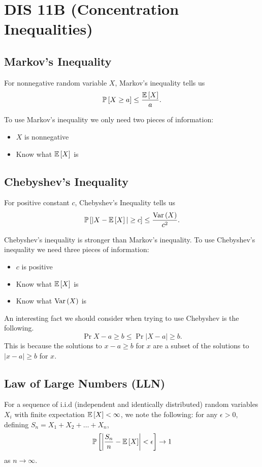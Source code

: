 \section{DIS 11B (Concentration Inequalities)}

\subsection{Markov's Inequality}
For nonnegative random variable $X$, Markov's inequality tells us \[ \mathbb{P}\left[ X \ge a \right] \le \frac{\mathbb{E}\left[ X \right]}{a}. \]

To use Markov's inequality we only need two pieces of information:
\begin{itemize}
    \item $X$ is nonnegative 
    \item Know what $\mathbb{E}\left[ X \right]$ is
\end{itemize}

\subsection{Chebyshev's Inequality}
For positive constant $c$, Chebyshev's Inequality tells us \[ \mathbb{P}\left[ |X-\mathbb{E}\left[ X \right]| \ge c \right] \le \frac{\text{Var}\left( X \right)}{c^2}. \]

Chebyshev's inequality is stronger than Markov's inequality. 
To use Chebyshev's inequality we need three pieces of information:
\begin{itemize}
    \item $c$ is positive
    \item Know what $\mathbb{E}\left[ X \right]$ is
    \item Know what $\text{Var}\left( X \right)$ is
\end{itemize}

An interesting fact we should consider when trying to use Chebyshev is the following. \[ \Pr{X - a \ge b} \le \Pr{|X-a| \ge b}. \] This is because the solutions to $x - a \ge b$ for $x$ are a subset of the solutions to $|x-a| \ge b$ for $x$. 

\subsection{Law of Large Numbers (LLN)}

\begin{theorem}
    For a sequence of i.i.d (independent and identically distributed) random variables $X_i$ with finite expectation $\mathbb{E}\left[ X \right] < \infty$, we note the following: for any $\epsilon > 0$, defining $S_n = X_1 + X_2 + \ldots + X_n$, \[ \mathbb{P}\left[ \left|\frac{S_n}{n} - \mathbb{E}\left[ X \right]\right| < \epsilon \right] \to 1 \] as $n \to \infty$. 
\end{theorem}